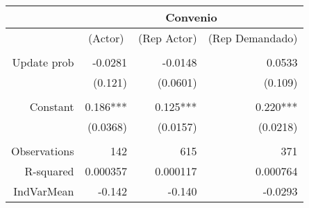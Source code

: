 \begin{tabular}{rrrr}
\toprule
      & \multicolumn{3}{c}{Convenio} \\
\midrule
      & \multicolumn{1}{c}{(Actor)} & \multicolumn{1}{c}{(Rep Actor)} & \multicolumn{1}{c}{(Rep Demandado)} \\
      & \multicolumn{1}{c}{} & \multicolumn{1}{c}{} & \multicolumn{1}{c}{} \\
Update prob & -0.0281 & -0.0148 & 0.0533 \\
      & (0.121) & (0.0601) & (0.109) \\
      &       &       &  \\
Constant  & 0.186*** & 0.125*** & 0.220*** \\
      & (0.0368) & (0.0157) & (0.0218) \\
      &       &       &  \\
Observations & 142   & 615   & 371 \\
R-squared & 0.000357 & 0.000117 & 0.000764 \\
IndVarMean & -0.142 & -0.140 & -0.0293 \\
\bottomrule
\end{tabular}%
